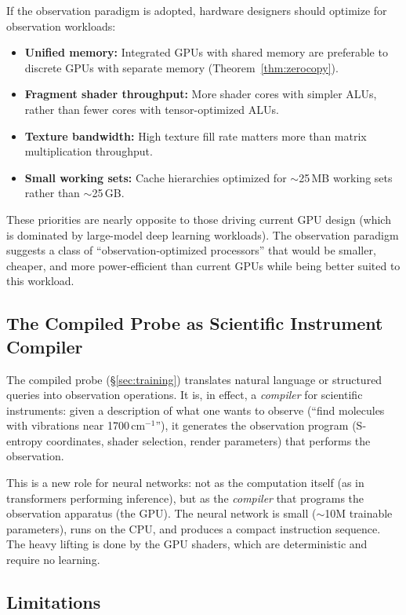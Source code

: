 \documentclass[11pt,twocolumn,a4paper]{article}
\begin{document}
If the observation paradigm is adopted, hardware designers should
optimize for observation workloads:
\begin{itemize}[leftmargin=*]
\item \textbf{Unified memory:} Integrated GPUs with shared memory
  are preferable to discrete GPUs with separate memory
  (Theorem~\ref{thm:zerocopy}).
\item \textbf{Fragment shader throughput:} More shader cores with
  simpler ALUs, rather than fewer cores with tensor-optimized ALUs.
\item \textbf{Texture bandwidth:} High texture fill rate matters
  more than matrix multiplication throughput.
\item \textbf{Small working sets:} Cache hierarchies optimized for
  $\sim$25\,MB working sets rather than $\sim$25\,GB.
\end{itemize}
These priorities are nearly opposite to those driving current GPU
design (which is dominated by large-model deep learning workloads).
The observation paradigm suggests a class of ``observation-optimized
processors'' that would be smaller, cheaper, and more power-efficient
than current GPUs while being better suited to this workload.

\subsection{The Compiled Probe as Scientific Instrument Compiler}

The compiled probe (\S\ref{sec:training}) translates natural language
or structured queries into observation operations. It is, in effect,
a \emph{compiler} for scientific instruments: given a description of
what one wants to observe (``find molecules with vibrations near
1700\,cm$^{-1}$''), it generates the observation program (S-entropy
coordinates, shader selection, render parameters) that performs the
observation.

This is a new role for neural networks: not as the computation itself
(as in transformers performing inference), but as the \emph{compiler}
that programs the observation apparatus (the GPU). The neural network
is small ($\sim$10M trainable parameters), runs on the CPU, and
produces a compact instruction sequence. The heavy lifting is done
by the GPU shaders, which are deterministic and require no learning.

\subsection{Limitations}
\end{document}
